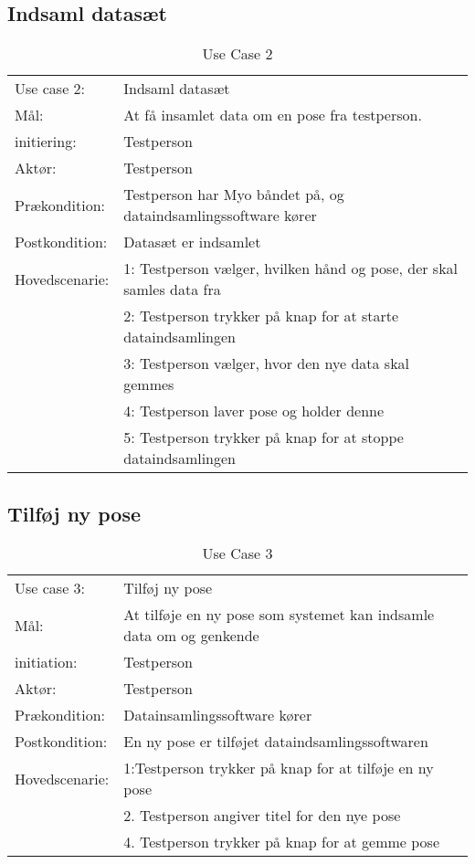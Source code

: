 \subsection{Indsaml datasæt}
\begin{center}
	\begin{table}[htbp]
		\begin{tabular}{lp{274pt}}
			\rowcolor{grey} Use case 2:		& Indsaml datasæt \\
			Mål: 	& At få insamlet data om en pose fra testperson. \\
			initiering:	& Testperson\\
			Aktør: & Testperson\\
			Prækondition: & Testperson har Myo båndet på, og dataindsamlingssoftware kører\\
			Postkondition: & Datasæt er indsamlet\\
			Hovedscenarie: & 1: Testperson vælger, hvilken hånd og pose, der skal samles data fra\\
			& 2: Testperson trykker på knap for at starte dataindsamlingen\\
			& 3: Testperson vælger, hvor den nye data skal gemmes\\
			& 4: Testperson laver pose og holder denne\\
			& 5: Testperson trykker på knap for at stoppe dataindsamlingen\\
		\end{tabular}
		\caption{Use Case 2}
	\end{table}
\end{center}

\subsection{Tilføj ny pose}
\begin{center}
	\begin{table}[htbp]
		\begin{tabular}{lp{274pt}}
			\rowcolor{grey} Use case 3:		& Tilføj ny pose\\
			Mål: 	& At tilføje en ny pose som systemet kan indsamle data om og genkende \\
			initiation:	& Testperson\\
			Aktør: & Testperson\\
			Prækondition: & Datainsamlingssoftware kører \\
			Postkondition: & En ny pose er tilføjet dataindsamlingssoftwaren\\
			Hovedscenarie: & 1:Testperson trykker på knap for at tilføje en ny pose\\
			& 2. Testperson angiver titel for den nye pose\\
			& 4. Testperson trykker på knap for at gemme pose\\
		\end{tabular}
		\caption{Use Case 3}
	\end{table}
\end{center}

